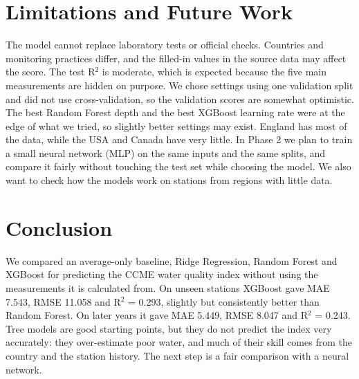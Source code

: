\documentclass[11pt,a4paper]{article}
\begin{document}
\section{Limitations and Future Work}
The model cannot replace laboratory tests or official checks. Countries and monitoring practices differ, and the filled-in values in the source data may affect the score. The test R$^2$ is moderate, which is expected because the five main measurements are hidden on purpose. We chose settings using one validation split and did not use cross-validation, so the validation scores are somewhat optimistic. The best Random Forest depth and the best XGBoost learning rate were at the edge of what we tried, so slightly better settings may exist. England has most of the data, while the USA and Canada have very little. In Phase 2 we plan to train a small neural network (MLP) on the same inputs and the same splits, and compare it fairly without touching the test set while choosing the model. We also want to check how the models work on stations from regions with little data.

\section{Conclusion}
We compared an average-only baseline, Ridge Regression, Random Forest and XGBoost for predicting the CCME water quality index without using the measurements it is calculated from. On unseen stations XGBoost gave MAE 7.543, RMSE 11.058 and R$^2$ = 0.293, slightly but consistently better than Random Forest. On later years it gave MAE 5.449, RMSE 8.047 and R$^2$ = 0.243. Tree models are good starting points, but they do not predict the index very accurately: they over-estimate poor water, and much of their skill comes from the country and the station history. The next step is a fair comparison with a neural network.


\end{document}
